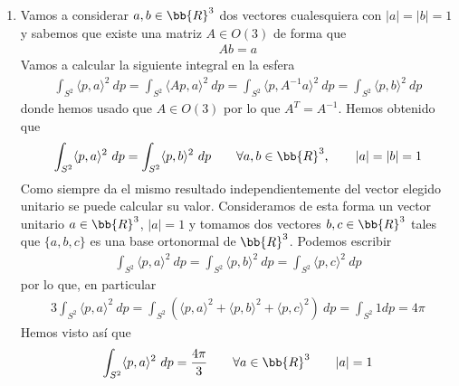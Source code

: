 \begin{ejemplo}
\begin{enumerate}
        \item Vamos a considerar $a,b\in \bb{R}^3$ dos vectores cualesquiera con $|a| = |b| = 1$ y sabemos que existe una matriz $A\in O(3)$ de forma que 
        \begin{gather*}
            Ab = a
        \end{gather*}
        Vamos a calcular la siguiente integral en la esfera
        \begin{gather*}
            \int_{S^2} \langle p,a \rangle^2\ dp = \int_{S^2} \langle Ap, a \rangle^2\ dp = \int_{S^2} \langle p, A^{-1}a\rangle^2\ dp = \int_{S^2} \langle p, b \rangle^2\ dp
        \end{gather*}
        donde hemos usado que $A\in O(3)$ por lo que $A^T = A^{-1}$. Hemos obtenido que 
        \begin{gather*}
            \int_{S^2} \langle p, a \rangle^2\ dp = \int_{S^2} \langle p, b \rangle^2\ dp \qquad \forall a, b\in \bb{R}^3, \qquad |a|=|b|=1
        \end{gather*}
        Como siempre da el mismo resultado independientemente del vector elegido unitario se puede calcular su valor. Consideramos de esta forma un vector unitario $a\in \bb{R}^3$, $|a|=1$ y tomamos dos vectores $b,c\in \bb{R}^3$ tales que $\{a,b,c\}$ es una base ortonormal de $\bb{R}^3$. Podemos escribir
        \begin{gather*}
            \int_{S^2} \langle p, a \rangle^2\ dp = \int_{S^2} \langle p, b \rangle^2\ dp = \int_{S^2} \langle p, c \rangle^2\ dp
        \end{gather*}
        por lo que, en particular
        \begin{gather*}
            3\int_{S^2} \langle p, a \rangle^2\ dp = \int_{S^2} (\langle p, a \rangle^2 + \langle p, b \rangle^2 + \langle p, c \rangle^2)\ dp = \int_{S^2} 1 dp = 4\pi
        \end{gather*}
        Hemos visto así que 
        \begin{gather*}
            \int_{S^2} \langle p,a\rangle^2\ dp = \frac{4\pi}{3} \qquad \forall a \in \bb{R}^3\qquad |a|=1
        \end{gather*}


\end{enumerate}
\end{ejemplo}
